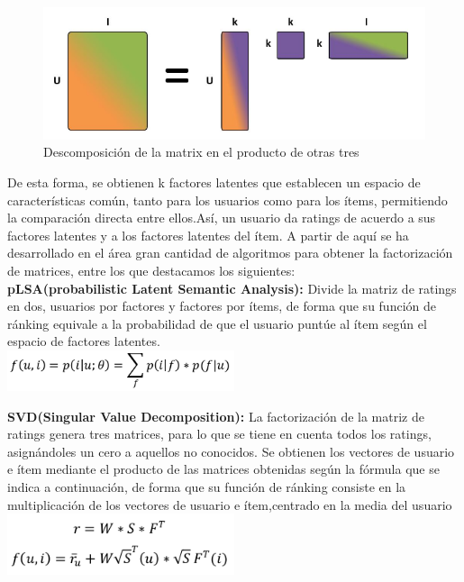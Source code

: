  		\begin{figure}[h!]
		 \centering
		 \includegraphics[width=12cm]{./images/matrix_fact}
		 \caption{Descomposición de la matrix en el producto de otras tres}
		 \label{fig: matrix factorization}
		\end{figure}
		\newpage
 		De esta forma, se obtienen k factores latentes que establecen un espacio de características común, tanto para los usuarios como para los ítems, permitiendo la comparación directa entre ellos.Así, un usuario da ratings de acuerdo a sus factores latentes y a los factores latentes del ítem.
 		A partir de aquí se ha desarrollado en el área gran cantidad de algoritmos para obtener la factorización de matrices, entre los que destacamos los siguientes:\\

 		\textbf{pLSA(probabilistic Latent Semantic Analysis):} Divide la matriz de ratings en dos, usuarios por factores y factores por ítems, de forma que su función de ránking equivale a la probabilidad de que el usuario puntúe al ítem según el espacio de factores latentes.\cite{43}\\
 		\includegraphics[width=0.5\textwidth]{images/plsa}

		\textbf{SVD(Singular Value Decomposition):} La factorización de la matriz de ratings genera tres matrices, para lo que se tiene en cuenta todos los ratings, asignándoles un cero a aquellos no conocidos. Se obtienen los vectores de usuario e ítem mediante el producto de las matrices obtenidas según la fórmula que se indica a continuación, de forma que su función de ránking consiste en la multiplicación de los vectores de usuario e ítem,centrado en la media del usuario\cite{43}\\
		\includegraphics[width=0.5\textwidth]{images/svd}

